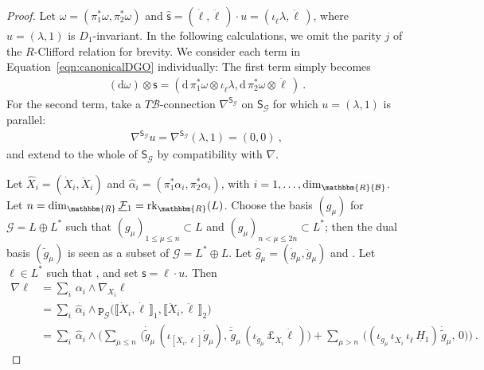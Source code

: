 \documentclass[a4paper, reqno, 11pt]{amsart}
\numberwithin{equation}{section}
\theoremstyle{definition}
\newcommand{\cbrak}[1]{\llbracket #1 \rrbracket}
\newcommand{\red}[1]{\underline{#1}}
\newcommand{\frk}[1]{\mathfrak{#1}}
\newcommand{\de}{\mathrm{d}}
\newcommand{\rmp}{\mathtt{p}}
\newcommand{\IR}{\mathbbm{R}}
\newcommand{\cB}{{\mathcal B}}
\newcommand{\cF}{{\mathcal F}}
\newcommand{\ccG}{{\mathscr G}}
\newcommand{\sfS}{{\mathsf{S}}}
\newcommand{\sfs}{{\mathsf{s}}}
\theoremstyle{remark}
\begin{document}
\begin{proof}
    Let $\widehat{\omega}=(\pi_1^*\omega, \pi_2^*\omega)$ and $\widehat{\mathsf{s}} = (\dot\ell,\ddot\ell\,) \cdot u=(\iota_{\dot\ell}\lambda,\ddot\ell\,)$, where $u = (\lambda,1)$  is $D_1$-invariant. In the following calculations, we omit the parity $j$ of the $R$-Clifford relation for brevity. 
    We consider each term in Equation~\eqref{eqn:canonicalDGO} individually: The first term simply becomes
    \begin{align}
        (\de\omega)\otimes\sfs = (\de\,\pi_1^*\omega\otimes\iota_{\dot\ell}\lambda,\de\,\pi_2^*\omega\otimes\ddot\ell\,) \ .
    \end{align}
    For the second term, take a $T\cB$-connection $\nabla^{\sfS_\ccG}$ on $\sfS_\ccG$ for which $u=(\lambda,1)$ is parallel:
    \begin{align}
        \nabla^{\sfS_\ccG}u = \nabla^{\sfS_\ccG}(\lambda,1) = (0,0) \ ,
    \end{align}
    and extend to the whole of $\sfS_\ccG$ by compatibility with $\nabla$.

    Let $\widehat X_i = (\dot X_i, \ddot X_i)$ and $\widehat \alpha_i=(\pi_1^*\alpha_i,\pi_2^*\alpha_i)$, with $i=1,\ldots,\dim_\IR\cB$. Let $n = \dim_\IR \red\cF{}_1 = {\rm rk}_\IR(L)$. Choose the basis $(g_\mu)$ for $\ccG=L\oplus L^*$ such that $(g_\mu)_{1\leqslant \mu\leqslant n}\subset L$ and $(g_\mu)_{n< \mu\leqslant 2n}\subset L^*$; then the dual basis $(\tilde g_\mu)$ is seen as a subset of $\ccG=L^* \oplus L$. Let $\widehat g_\mu=(\dot g_\mu,\ddot g_\mu)$ and . Let $\ell\in L^*$ such that \smash{$\widehat\ell = (\dot\ell,\ddot\ell) \in \frk{k}_{\tau_1}$}, and set $\sfs = \ell\cdot u$.
    Then
    \begin{equation}
    \begin{aligned}
        \nabla\ell &= \sum_i\, \alpha_i \wedge \nabla_{X_i}\ell \\[4pt]
        &= \sum_{i}\, \widehat \alpha_i  \wedge \rmp_\ccG\big(\cbrak{\dot X_i, \dot\ell\,}_1, \cbrak{\ddot X_i, \ddot\ell\, }_2\big)\\[4pt]
        &= \sum_i\,\widehat \alpha_i \wedge\Big( \sum_{\mu \leqslant n}\,  \big(\dot {\tilde g}_\mu\, (\iota_{[\dot X_i, \dot\ell\,]} \dot g_\mu),\, \ddot {\tilde g}_\mu \, (\iota_{\ddot g_\mu} \, \pounds_{\ddot X_i} \ddot\ell\,)\big) + \sum_{\mu >n}\,  \big( (\iota_{\dot g_\mu}\,\iota_{\dot X_i}\, \iota_{\dot\ell}\, \red H{}_1)\,\dot {\tilde g}_\mu,\, 0\big)\Big) \ .
    \end{aligned}
    \end{equation}


\end{proof}
\end{document}

